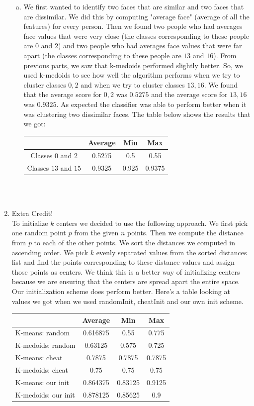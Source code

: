 \documentclass[11pt]{article}
\begin{document}
\begin{enumerate}[1]
\begin{enumerate}[(a)]
\item We first wanted to identify two faces that are similar and two faces that are dissimilar. We did this by computing "average face" (average of all the features) for every person. Then we found two people who had averages face values that were very close (the classes corresponding to these people are $0$ and $2$) and two people who had averages face values that were far apart (the classes corresponding to these people are $13$ and $16$). From previous parts, we saw that k-medoids performed slightly better. So, we used k-medoids to see how well the algorithm performs when we try to cluster classes $0,2$ and when we try to cluster classes $13,16$. We found that the average score for $0,2$ was $0.5275$ and the average score for $13, 16$ was $0.9325$. As expected the classifier was able to perform better when it was clustering two dissimilar faces.  The table below shows the results that we got: \\
 \begin{tabular}{| c | c | c | c |}
  \hline		
   & Average & Min & Max \\
  \hline
  Classes $0$ and $2$ & 0.5275 & 0.5 & 0.55 \\
  Classes $13$ and $15$ & 0.9325 & 0.925 & 0.9375   \\
  \hline
\end{tabular}\\ \\
\end{enumerate}
\item Extra Credit! \\
To initialize $k$ centers we decided to use the following approach. We first pick one random point $p$ from the given $n$ points. Then we compute the distance from $p$ to each of the other points. We sort the distances we computed in ascending order. We pick $k$ evenly separated values from the sorted distances list and find the points corresponding to these distance values and assign those points as centers. We think this is a better way of initializing centers because we are ensuring that the centers are spread apart the entire space. \\
Our initialization scheme does perform better. Here's a table looking at values we got when we used randomInit, cheatInit and our own init scheme. \\
 \begin{tabular}{| l | c | c | c |}
  \hline		
   & Average & Min & Max \\
  \hline
K-means: random & 0.616875 & 0.55 & 0.775 \\
  K-medoids: random & 0.63125 & 0.575 & 0.725   \\
K-means: cheat & 0.7875 & 0.7875 & 0.7875 \\
  K-medoids: cheat  & 0.75 & 0.75 & 0.75   \\
K-means: our init & 0.864375 & 0.83125 & 0.9125 \\
  K-medoids: our init  & 0.878125 & 0.85625 & 0.9   \\
  \hline
\end{tabular}

 \end{enumerate}
\end{document}

